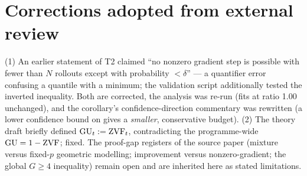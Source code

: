 \section{Corrections adopted from external review}
\label{sec:corrections}
(1) An earlier statement of T2 claimed ``no nonzero gradient step is possible
with fewer than $N$ rollouts except with probability $<\delta$'' --- a
quantifier error confusing a quantile with a minimum; the validation script
additionally tested the inverted inequality. Both are corrected, the analysis
was re-run (fits at ratio 1.00 unchanged), and the corollary's
confidence-direction commentary was rewritten (a lower confidence bound on
\ZVF{} gives a \emph{smaller}, conservative budget). (2) The theory draft
briefly defined $\mathrm{GU}_t:=\mathrm{ZVF}_t$, contradicting the programme-wide
$\mathrm{GU}=1-\mathrm{ZVF}$; fixed. The proof-gap registers of the source paper (mixture
versus fixed-$p$ geometric modelling; improvement versus nonzero-gradient;
the global $G\ge4$ inequality) remain open and are inherited here as stated
limitations.
